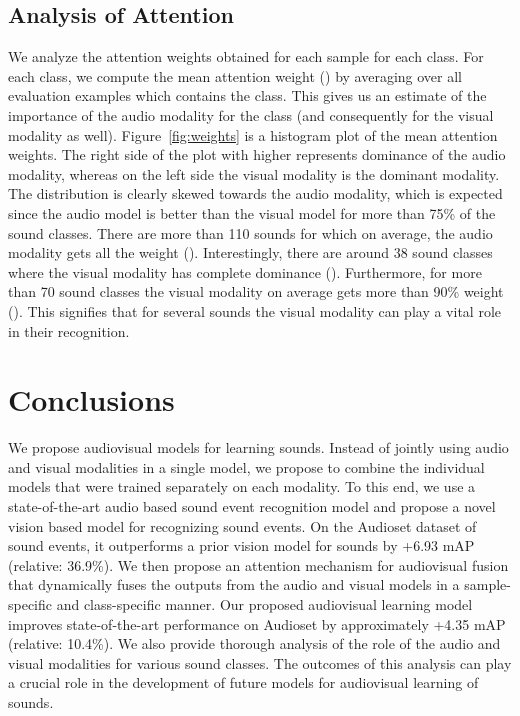 \documentclass{article}
\begin{document}
\subsection{Analysis of Attention}
We analyze the attention weights obtained for each sample for each class.
For each class, we compute the mean attention weight () by averaging over all evaluation examples which contains the  class. This gives us an estimate of the importance of the audio modality for the  class (and consequently for the visual modality as well). 
Figure~\ref{fig:weights} is a histogram plot of the mean attention weights.
The right side of the plot with higher  represents dominance of the audio modality, whereas on the left side the visual modality is the dominant modality.
The distribution is clearly skewed towards the audio modality, which is expected since the audio model is better than the visual model for more than 75\% of the sound classes.
There are more than 110 sounds for which on average, the audio modality gets all the weight ().
Interestingly, there are around 38 sound classes where the visual modality has complete dominance (). Furthermore, for more than 70 sound classes the visual modality on average gets more than 90\% weight (). This signifies that for several sounds the visual modality can play a vital role in their recognition. 

\section{Conclusions}\label{sec:conclusion}

We propose audiovisual models for learning sounds.
Instead of jointly using audio and visual modalities in a single model, we propose to combine the individual models that were trained separately on each modality. To this end, we use a state-of-the-art audio based sound event recognition model and propose a novel vision based model for recognizing sound events. On the Audioset dataset of sound events, it outperforms a prior vision model for sounds by +6.93 mAP (relative: 36.9\%).  
We then propose an attention mechanism for audiovisual fusion that dynamically fuses the outputs from the audio and visual models in a sample-specific and class-specific manner.
Our proposed audiovisual learning model improves state-of-the-art performance on Audioset by approximately +4.35 mAP (relative: 10.4\%).
We also provide thorough analysis of the role of the audio and visual modalities for various sound classes.
The outcomes of this analysis can play a crucial role in the development of future models for audiovisual learning of sounds. 



\end{document}
